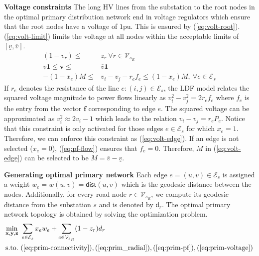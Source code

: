 \documentclass[sigconf]{acmart}
\begin{document}
\noindent\textbf{Voltage constraints}
The long HV lines from the substation to the root nodes in the optimal primary distribution network end in voltage regulators which ensure that the root nodes have a voltage of $1$pu. This is ensured by (\ref{eq:volt-root}). (\ref{eq:volt-limit}) limits the voltage at all nodes within the acceptable limits of $[\underline{v},\overline{v}]$.
\begin{subequations}
	\begin{align}
	(1-v_r)\leq &z_r~\forall r\in\mathcal{V}_{s_R}\label{eq:volt-root}\\
	\underline{v}\mathbf{1}\leq \mathbf{v}\leq &\overline{v}\mathbf{1}\label{eq:volt-limit}\\
	-(1-x_e)M\leq &v_i-v_j-r_ef_e\leq(1-x_e)M,~\forall e\in\mathcal{E}_s\label{eq:volt-edge}
	\end{align}
	\label{eq:prim-voltage}
\end{subequations}
If $r_e$ denotes the resistance of the line $e:(i,j)\in\mathcal{E}_s$, the LDF model relates the squared voltage magnitude to power flows linearly as $v_i^2-v_j^2=2r_ef_e$ where $f_e$ is the entry from the vector $\mathbf{f}$ corresponding to edge $e$. The squared voltage can be approximated as $v_i^2\approx 2v_i-1$ which leads to the relation $v_i-v_j=r_eP_e$. Notice that this constraint is only activated for those edges $e\in\mathcal{E}_s$ for which $x_e=1$. Therefore, we can enforce this constraint as (\ref{eq:volt-edge}). If an edge is not selected ($x_e=0$), (\ref{eq:pf-flow}) ensures that $f_e=0$. Therefore, $M$ in (\ref{eq:volt-edge}) can be selected to be $M=\overline{v}-\underline{v}$.

\noindent\textbf{Generating optimal primary network} Each edge $e=(u,v)\in\mathcal{E}_s$ is assigned a weight $w_e=w(u,v)=\mathsf{dist}(u,v)$ which is the geodesic distance between the nodes. Additionally, for every road node $r\in\mathcal{V}_{s_R}$, we compute its geodesic distance from the substation $s$ and is denoted by $\mathsf{d}_r$. The optimal primary network topology is obtained by solving the optimization problem.
\begin{equation}
\begin{aligned}
\min_{\mathbf{x},\mathbf{y},\mathbf{z}}&~\sum_{e\in\mathcal{E}_s}x_ew_e+\sum_{e\in\mathcal{V}_{s_R}}(1-z_r)d_r\\
\textrm{s.to.}&~(\ref{eq:prim-connectivity}),(\ref{eq:prim_radial}),(\ref{eq:prim-pf}),(\ref{eq:prim-voltage})
\end{aligned}
\end{equation}
\end{document}
